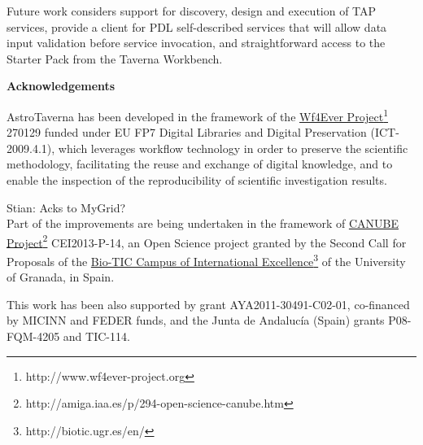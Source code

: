 \documentclass{aa}
\begin{document}
Future work considers support for discovery, design and execution of TAP services, provide a client for PDL self-described services that will allow data input validation before service invocation, and straightforward access to the Starter Pack from the Taverna Workbench.

\textbf{Acknowledgements}

AstroTaverna has been developed in the framework of the \href{http://www.wf4ever-project.org}{Wf4Ever Project}\footnote{http://www.wf4ever-project.org} 270129 funded under EU FP7 Digital Libraries and Digital Preservation (ICT-2009.4.1), which leverages workflow technology in order to preserve the scientific methodology, facilitating the reuse and exchange of digital knowledge, and to enable the inspection of the reproducibility of scientific investigation results.

{\color{red}Stian: Acks to MyGrid?}\\

Part of the improvements are being undertaken in the framework of \href{http://amiga.iaa.es/p/294-open-science-canube.htm}{CANUBE Project}\footnote{http://amiga.iaa.es/p/294-open-science-canube.htm} CEI2013-P-14, an Open Science project granted by the Second Call for Proposals of the \href{http://biotic.ugr.es/en/}{Bio-TIC Campus of International Excellence}\footnote{http://biotic.ugr.es/en/} of the University of Granada, in Spain.

This work has been also supported by grant AYA2011-30491-C02-01, co-financed by MICINN and FEDER funds, and the Junta de Andalucía (Spain) grants P08-FQM-4205 and TIC-114.


\end{document}
